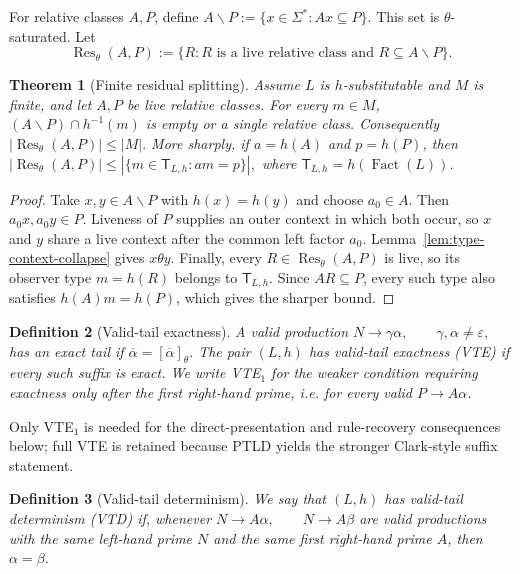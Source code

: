 \documentclass[11pt,a4paper]{article}
\newtheorem{theorem}{Theorem}[section]
\newtheorem{definition}[theorem]{Definition}
\newcommand{\eps}{\varepsilon}
\newcommand{\Fact}{\operatorname{Fact}}
\begin{document}
For relative classes $A,P$, define
\(A\backslash P:=\{x\in\Sigma^*:Ax\subseteq P\}.\)
This set is $\theta$-saturated.  Let
\[
  \operatorname{Res}_\theta(A,P)
  :=\{R:R\text{ is a live relative class and }R\subseteq A\backslash P\}.
\]

\begin{theorem}[Finite residual splitting]
\label{thm:finite-residual-splitting}
Assume $L$ is $h$-substitutable and $M$ is finite, and let $A,P$ be live relative classes.  For every $m\in M$,
\((A\backslash P)\cap h^{-1}(m)\)
is empty or a single relative class.  Consequently
\(|\operatorname{Res}_\theta(A,P)|\le |M|.\)
More sharply, if $a=h(A)$ and $p=h(P)$, then
\(|\operatorname{Res}_\theta(A,P)| \le |\{m\in \mathsf T_{L,h}:am=p\}|,\)
where $\mathsf T_{L,h}=h(\Fact(L))$.
\end{theorem}

\begin{proof}
Take $x,y\in A\backslash P$ with $h(x)=h(y)$ and choose $a_0\in A$.
Then $a_0x,a_0y\in P$.  Liveness of $P$ supplies an outer context in
which both occur, so $x$ and $y$ share a live context after the common
left factor $a_0$.  Lemma~\ref{lem:type-context-collapse} gives
$x\theta y$.  Finally, every $R\in\operatorname{Res}_\theta(A,P)$ is live, so its observer type $m=h(R)$ belongs to $\mathsf T_{L,h}$.  Since $AR\subseteq P$, every such type also satisfies $h(A)m=h(P)$, which gives the sharper bound.
\end{proof}

\begin{definition}[Valid-tail exactness]
A valid production
\(N\to\gamma\alpha, \qquad \gamma,\alpha\ne\eps,\)
has an \emph{exact tail} if
\(\overline\alpha=[\overline\alpha]_\theta.\)
The pair $(L,h)$ has \emph{valid-tail exactness} (VTE) if every such suffix is exact.  We write VTE$_1$ for the weaker condition requiring exactness only after the first right-hand prime, i.e. for every valid $P\to A\alpha$.
\end{definition}

Only VTE$_1$ is needed for the direct-presentation and rule-recovery consequences below; full VTE is retained because PTLD yields the stronger Clark-style suffix statement.

\begin{definition}[Valid-tail determinism]
We say that $(L,h)$ has \emph{valid-tail determinism} (VTD) if, whenever
\(N\to A\alpha, \qquad N\to A\beta\)
are valid productions with the same left-hand prime $N$ and the same first right-hand prime $A$, then $\alpha=\beta$.
\end{definition}
\end{document}
